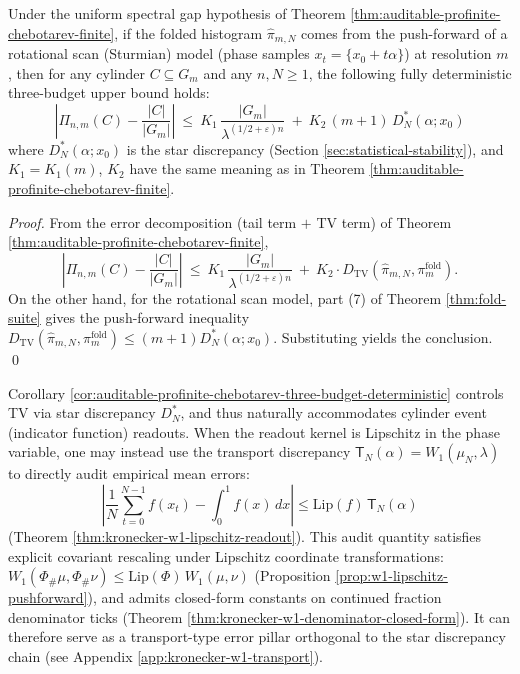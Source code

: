 \begin{corollary}[Deterministic three-budget law: discrepancy \texorpdfstring{$\Rightarrow$}{=>} TV \texorpdfstring{$\Rightarrow$}{=>} Chebotarev]\label{cor:auditable-profinite-chebotarev-three-budget-deterministic}
Under the uniform spectral gap hypothesis of Theorem \ref{thm:auditable-profinite-chebotarev-finite}, if the folded histogram \(\hat{\pi}_{m,N}\) comes from the push-forward of a rotational scan (Sturmian) model (phase samples \(x_t=\{x_0+t\alpha\}\)) at resolution \(m\), then for any cylinder \(C\subseteq G_m\) and any \(n,N\ge 1\), the following fully deterministic three-budget upper bound holds:
\[
\boxed{\;
\left|\Pi_{n,m}(C)-\frac{|C|}{|G_m|}\right|
\ \le\
K_1\,\frac{|G_m|}{\lambda^{(1/2+\varepsilon)n}}
\ +\
K_2\,(m+1)\,D_N^*(\alpha;x_0)\;}
\]
where \(D_N^*(\alpha;x_0)\) is the star discrepancy (Section \ref{sec:statistical-stability}), and \(K_1=K_1(m)\), \(K_2\) have the same meaning as in Theorem \ref{thm:auditable-profinite-chebotarev-finite}.
\end{corollary}
\begin{proof}
From the error decomposition (tail term \(+\) TV term) of Theorem \ref{thm:auditable-profinite-chebotarev-finite},
\[
\left|\Pi_{n,m}(C)-\frac{|C|}{|G_m|}\right|
\ \le\
K_1\,\frac{|G_m|}{\lambda^{(1/2+\varepsilon)n}}
\ +\
K_2\cdot D_{\mathrm{TV}}(\hat{\pi}_{m,N},\pi_m^{\mathrm{fold}}).
\]
On the other hand, for the rotational scan model, part (7) of Theorem \ref{thm:fold-suite} gives the push-forward inequality
\(
D_{\mathrm{TV}}(\hat{\pi}_{m,N},\pi_m^{\mathrm{fold}})\le (m+1)D_N^*(\alpha;x_0)
\).
Substituting yields the conclusion. \qed
\end{proof}

\begin{remark}\label{rem:auditable-profinite-chebotarev-w1-transport}
Corollary \ref{cor:auditable-profinite-chebotarev-three-budget-deterministic} controls TV via star discrepancy \(D_N^*\), and thus naturally accommodates cylinder event (indicator function) readouts.
When the readout kernel is Lipschitz in the phase variable, one may instead use the transport discrepancy
\(
\mathsf{T}_N(\alpha)=W_1(\mu_N,\lambda)
\)
to directly audit empirical mean errors:
\[
\left|\frac1N\sum_{t=0}^{N-1}f(x_t)-\int_0^1 f(x)\,dx\right|
\le
\mathrm{Lip}(f)\,\mathsf{T}_N(\alpha)
\]
(Theorem \ref{thm:kronecker-w1-lipschitz-readout}).
This audit quantity satisfies explicit covariant rescaling under Lipschitz coordinate transformations:
\(
W_1(\Phi_\#\mu,\Phi_\#\nu)\le \mathrm{Lip}(\Phi)\,W_1(\mu,\nu)
\)
(Proposition \ref{prop:w1-lipschitz-pushforward}), and admits closed-form constants on continued fraction denominator ticks (Theorem \ref{thm:kronecker-w1-denominator-closed-form}).
It can therefore serve as a transport-type error pillar orthogonal to the star discrepancy chain (see Appendix \ref{app:kronecker-w1-transport}).
\end{remark}

